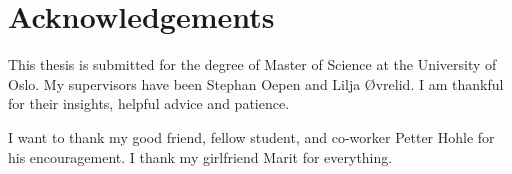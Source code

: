 \chapter*{Acknowledgements}
\thispagestyle{empty}

This thesis is submitted for the degree of Master of Science at the University of Oslo. My supervisors have been Stephan Oepen and Lilja Øvrelid. I am thankful for their insights, helpful advice and patience.

I want to thank my good friend, fellow student, and co-worker Petter Hohle for his encouragement. I thank my girlfriend Marit for everything.